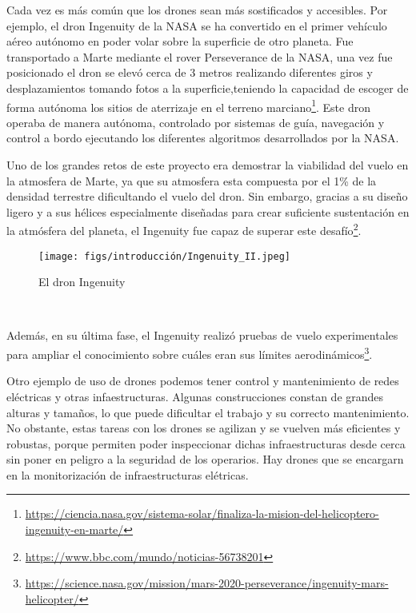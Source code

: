 Cada vez es más común que los drones sean más sostificados y accesibles. Por ejemplo, el dron Ingenuity de la NASA se ha convertido en el primer vehículo aéreo autónomo en poder volar
sobre la superficie de otro planeta. Fue transportado a Marte mediante el rover Perseverance de la NASA, una vez fue posicionado el dron se elevó cerca de 3 metros realizando 
diferentes giros y desplazamientos tomando fotos a la superficie,teniendo la capacidad de escoger de forma autónoma los sitios de aterrizaje en el terreno marciano\footnote{\url{https://ciencia.nasa.gov/sistema-solar/finaliza-la-mision-del-helicoptero-ingenuity-en-marte/}}.
Este dron operaba de manera autónoma, controlado por sistemas de guía, navegación y control a bordo ejecutando los diferentes algoritmos desarrollados por la NASA. \newline

Uno de los grandes retos de este proyecto era demostrar la viabilidad del vuelo en la atmosfera de Marte, ya que su atmosfera esta compuesta por el 1\% de la densidad terrestre
dificultando el vuelo del dron. Sin embargo, gracias a su diseño ligero y a sus hélices especialmente diseñadas para crear suficiente sustentación en la atmósfera del planeta, el Ingenuity 
fue capaz de superar este desafío\footnote{\url{https://www.bbc.com/mundo/noticias-56738201}}. \newline
\begin{figure} [H]
  \begin{center}
    \texttt{[image: figs/introducción/Ingenuity\_II.jpeg]}
  \end{center}
  \caption{El dron Ingenuity}
  \label{fig:Ingenuity}
\end{figure}\

Además, en su última fase, el Ingenuity realizó pruebas de vuelo experimentales para ampliar el conocimiento sobre cuáles eran sus límites aerodinámicos\footnote{\url{https://science.nasa.gov/mission/mars-2020-perseverance/ingenuity-mars-helicopter/}}.\newline

Otro ejemplo de uso de drones podemos tener control y mantenimiento de redes eléctricas y otras infaestructuras. Algunas construcciones constan de grandes alturas y tamaños, lo que puede
dificultar el trabajo y su correcto mantenimiento. No obstante, estas tareas con los drones se agilizan y se vuelven más eficientes y robustas, porque permiten poder
inspeccionar dichas infraestructuras desde cerca sin poner en peligro a la seguridad de los operarios. 
Hay drones que se encargarn en la monitorización de infraestructuras elétricas. \newline

